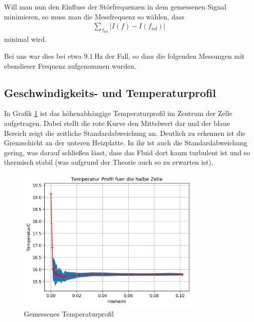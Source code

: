 \documentclass[12pt,a4paper,titlepage,headinclude]{scrartcl}
\numberwithin{equation}{subsection}
\begin{document}
Will man nun den Einfluss der Störfrequenzen in dem gemessenen Signal minimieren, so muss man die Messfrequenz so wählen, dass
\begin{align}
  \sum_{f_\text{ref}} |I(f)-I(f_\text{ref})|
\end{align}
minimal wird.

Bei uns war dies bei etwa $\SI{9.1}\hertz$ der Fall, so dass die folgenden Messungen mit ebendieser Frequenz aufgenommen wurden.

\subsection{Geschwindigkeits- und Temperaturprofil}
\label{sec:profile}
In Grafik \ref{fig:T_fahrt} ist das höhenabhängige Temperaturprofil im Zentrum der Zelle aufgetragen.
Dabei stellt die rote Kurve den Mittelwert dar und der blaue Bereich zeigt die zeitliche Standardabweichung an.
Deutlich zu erkennen ist die Grenzschicht an der unteren Heizplatte.
In ihr ist auch die Standardabweichung gering, was darauf schließen lässt, dass das Fluid dort kaum turbulent ist und so thermisch stabil (was aufgrund der Theorie auch so zu erwarten ist).
\begin{figure}[!ht]
\centering
\includegraphics[width=0.8\textwidth]{T_fahrt.png}
\caption{Gemessenes Temperaturprofil}
\label{fig:T_fahrt}
\end{figure}
\end{document}
